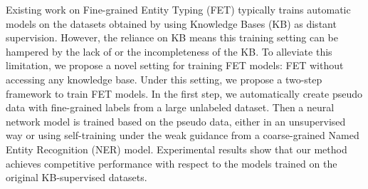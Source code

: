 Existing work on Fine-grained Entity Typing (FET) typically trains automatic models on the datasets obtained by using Knowledge Bases (KB) as distant supervision. However, the reliance on KB means this training setting can be hampered by the lack of or the incompleteness of the KB. To alleviate this limitation, we propose a novel setting for training FET models: FET without accessing any knowledge base. Under this setting, we propose a  two-step framework to train FET models. In the first step, we automatically create pseudo data with fine-grained labels from a large unlabeled dataset. Then a neural network model is trained based on the pseudo data, either in an unsupervised way or using self-training under the weak guidance from a coarse-grained Named Entity Recognition (NER) model. Experimental results show that our method achieves competitive performance with respect to the models trained on the original KB-supervised datasets.
